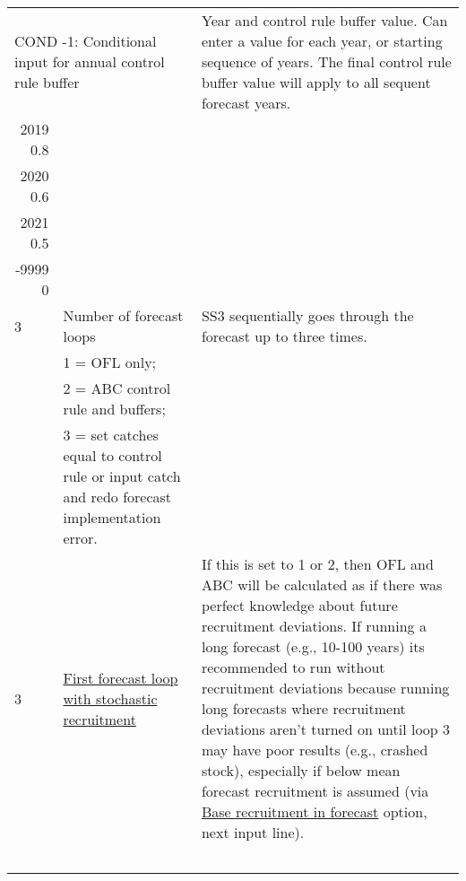 \begin{landscape}
{\begin{longtable}{p{2cm} p{7cm} p{12cm}}
  \multicolumn{2}{l}{COND -1: Conditional input for annual control rule buffer} & \multirow{1}{1cm}[-0.25cm]{\parbox{12cm}{Year and control rule buffer value. Can enter a value for each year, or starting sequence of years. The final control rule buffer value will apply to all sequent forecast years.}} \\
  \multicolumn{1}{r}{2019 0.8} & & \\
  \multicolumn{1}{r}{2020 0.6} & & \\ 
  \multicolumn{1}{r}{2021 0.5} & & \\ 
  \multicolumn{1}{r}{-9999 0} & & \\ 

  \hline
  3 \Tstrut & Number of forecast loops & \multirow{1}{1cm}[-0.25cm]{\parbox{12cm}{SS3 sequentially goes through the forecast up to three times.}} \\
    & 1 = OFL only; & \\
    & 2 = ABC control rule and buffers; & \\
    & 3 = set catches equal to control rule or input catch and redo forecast implementation error. & \Bstrut\\

  \hline
  3 \Tstrut & \hyperlink{appendB}{First forecast loop with stochastic recruitment} & \multirow{1}{1cm}[-0.25cm]{\parbox{12cm}{If this is set to 1 or 2, then OFL and ABC will be calculated as if there was perfect knowledge about future recruitment deviations. If running a long forecast (e.g., 10-100 years) its recommended to run without recruitment deviations because running long forecasts where recruitment deviations aren't turned on until loop 3 may have poor results (e.g., crashed stock), especially if below mean forecast recruitment is assumed (via \hyperlink{FcastRecruitment}{Base recruitment in forecast} option, next input line).}} \Bstrut\\
    & & \\
    & & \\
    & & \\
    & & \\
    & & \\


\end{longtable}}
\end{landscape}
